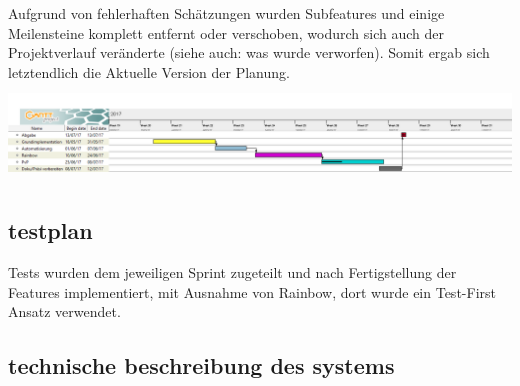 \documentclass[12pt]{article}
\theoremstyle{plain}
\begin{document}
\begin{linenumbers}
Aufgrund von fehlerhaften Schätzungen wurden Subfeatures und einige Meilensteine komplett entfernt oder verschoben, wodurch sich auch der Projektverlauf veränderte (siehe auch: was wurde verworfen). Somit ergab sich letztendlich die Aktuelle Version der Planung.
\newline
\includegraphics[width=1\textwidth, height=100px]{images/gant.png}
\newline

\subsection{testplan}
Tests wurden dem jeweiligen Sprint zugeteilt und nach Fertigstellung der Features implementiert,
mit Ausnahme von Rainbow, dort wurde ein Test-First Ansatz verwendet.

\subsection{technische beschreibung des systems}


\end{linenumbers}
\end{document}
